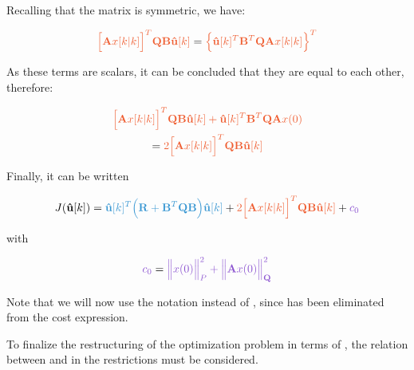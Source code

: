 Recalling that the matrix  is symmetric, we have:

\begin{equation}
	\orange{\Big[ \mathbf{A}x[k|k] \Big]^T \mathbf{Q} \mathbf{B} \mathbf{\hat{u}}[k]} = 
	\orange{\Big\{ \mathbf{\hat{u}}[k]^T \mathbf{B}^T \mathbf{Q} \mathbf{A} x[k|k] \Big\}^T}
\end{equation}

As these terms are scalars, it can be concluded that they are equal to each other, therefore:

\noindent
\begin{equation}
	\begin{gathered}
		\orange{\Big[ \mathbf{A}x[k|k] \Big]^T \mathbf{Q} \mathbf{B} \mathbf{\hat{u}}[k] + \mathbf{\hat{u}}[k]^T \mathbf{B}^T \mathbf{Q} \mathbf{A} x(0)} \\
		= \orange{2\Big[ \mathbf{A}x[k|k] \Big]^T \mathbf{Q} \mathbf{B} \mathbf{\hat{u}}[k]}
	\end{gathered}
\end{equation}

Finally, it can be written

\noindent
\begin{equation}
	\begin{gathered}
		J(\mathbf{\hat{u}}[k]) = 
			\blue{\mathbf{\hat{u}}[k]^T \Big(\mathbf{R} + \mathbf{B}^T \mathbf{Q} \mathbf{B} \Big) \mathbf{\hat{u}}[k]} + 
			\orange{2 \Big[ \mathbf{A}x[k|k] \Big]^T \mathbf{Q} \mathbf{B} \mathbf{\hat{u}}[k]} + 
			\purple{c_0}
	\end{gathered}
\end{equation}

with

\noindent
\begin{equation}
	\purple{ c_0 } = 
	\purple{ \norma{x(0)}{P} + \norma{\mathbf{A} x(0)}{\mathbf{Q}} }
\end{equation}


Note that we will now use the notation  instead of , 
since  has been eliminated from the cost expression. 


To finalize the restructuring of the optimization problem in terms of , the relation between 
 and  in the restrictions must be considered.

